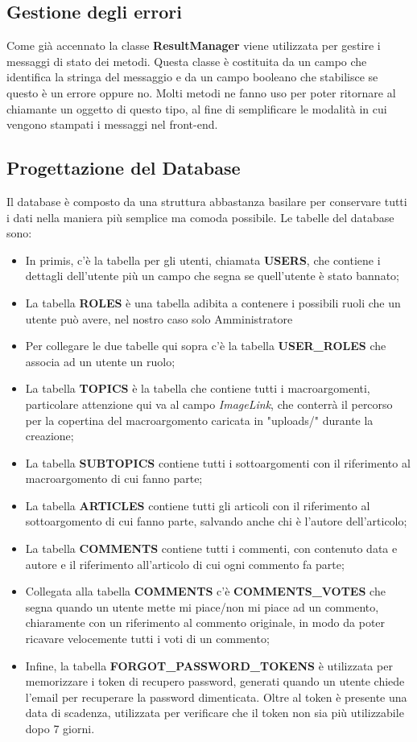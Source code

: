 \documentclass[12pt]{article}
\begin{document}
	\subsection{Gestione degli errori}
	Come già accennato la classe \textbf{ResultManager} viene utilizzata per gestire i messaggi di stato dei metodi.
	Questa classe è costituita da un campo che identifica la stringa del messaggio e da un campo booleano che stabilisce se questo è un errore oppure no.
	Molti metodi ne fanno uso per poter ritornare al chiamante un oggetto di questo tipo, al fine di semplificare le modalità in cui vengono stampati i messaggi nel front-end.
	
	\subsection{Progettazione del Database}
	Il database è composto da una struttura abbastanza basilare per conservare tutti i dati nella maniera più semplice ma comoda possibile. Le tabelle del database sono:
	\begin{itemize}
	\item In primis, c'è la tabella per gli utenti, chiamata \textbf{USERS}, che contiene i dettagli dell'utente più un campo che segna se quell'utente è stato bannato;
	\item La tabella \textbf{ROLES} è una tabella adibita a contenere i possibili ruoli che un utente può avere, nel nostro caso solo Amministratore
	\item Per collegare le due tabelle qui sopra c'è la tabella \textbf{USER\_ROLES} che associa ad un utente un ruolo;
	\item La tabella \textbf{TOPICS} è la tabella che contiene tutti i macroargomenti, particolare attenzione qui va al campo \textit{ImageLink}, che conterrà il percorso per la copertina del macroargomento caricata in "uploads/" durante la creazione;
	\item La tabella \textbf{SUBTOPICS} contiene tutti i sottoargomenti con il riferimento al macroargomento di cui fanno parte;
	\item La tabella \textbf{ARTICLES} contiene tutti gli articoli con il riferimento al sottoargomento di cui fanno parte, salvando anche chi è l'autore dell'articolo;
	\item La tabella \textbf{COMMENTS} contiene tutti i commenti, con contenuto data e autore e il riferimento all'articolo di cui ogni commento fa parte;
	\item Collegata alla tabella \textbf{COMMENTS} c'è \textbf{COMMENTS\_VOTES} che segna quando un utente mette mi piace/non mi piace ad un commento, chiaramente con un riferimento al commento originale, in modo da poter ricavare velocemente tutti i voti di un commento;
	\item Infine, la tabella \textbf{FORGOT\_PASSWORD\_TOKENS} è utilizzata per memorizzare i token di recupero password, generati quando un utente chiede l'email per recuperare la password dimenticata. Oltre al token è presente una data di scadenza, utilizzata per verificare che il token non sia più utilizzabile dopo 7 giorni.
	\end{itemize}
	
\end{document}
